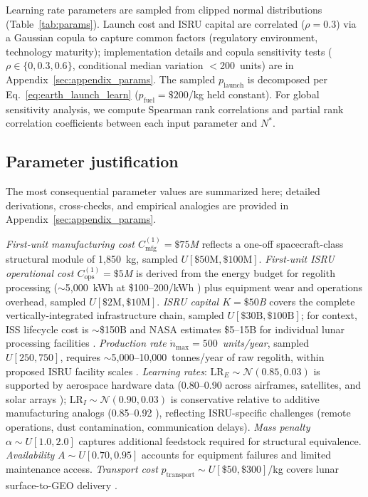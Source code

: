 \documentclass[preprint,12pt]{elsarticle}
\begin{document}
Learning rate parameters are sampled from clipped normal distributions (Table~\ref{tab:params}). Launch cost and ISRU capital are correlated ($\rho = 0.3$) via a Gaussian copula to capture common factors (regulatory environment, technology maturity); implementation details and copula sensitivity tests ($\rho \in \{0, 0.3, 0.6\}$, conditional median variation $<$200~units) are in Appendix~\ref{sec:appendix_params}. The sampled $p_{\mathrm{launch}}$ is decomposed per Eq.~\ref{eq:earth_launch_learn} ($p_{\mathrm{fuel}} = \$200$/kg held constant). For global sensitivity analysis, we compute Spearman rank correlations and partial rank correlation coefficients between each input parameter and $N^*$.

\subsection{Parameter justification}
\label{sec:param_justification}

The most consequential parameter values are summarized here; detailed derivations, cross-checks, and empirical analogies are provided in Appendix~\ref{sec:appendix_params}.

\emph{First-unit manufacturing cost $C_{\mathrm{mfg}}^{(1)} = \$75$M} reflects a one-off spacecraft-class structural module of 1{,}850~kg, sampled $U[\$50\text{M}, \$100\text{M}]$. \emph{First-unit ISRU operational cost $C_{\mathrm{ops}}^{(1)} = \$5$M} is derived from the energy budget for regolith processing ($\sim$5{,}000~kWh at \$100--200/kWh \cite{cilliers2023}) plus equipment wear and operations overhead, sampled $U[\$2\text{M}, \$10\text{M}]$. \emph{ISRU capital $K = \$50$B} covers the complete vertically-integrated infrastructure chain, sampled $U[\$30\text{B}, \$100\text{B}]$; for context, ISS lifecycle cost is $\sim$\$150B and NASA estimates \$5--15B for individual lunar processing facilities \cite{sanders2015,nasa2015handbook}. \emph{Production rate $\dot{n}_{\max} = 500$~units/year}, sampled $U[250, 750]$, requires $\sim$5{,}000--10{,}000~tonnes/year of raw regolith, within proposed ISRU facility scales \cite{sanders2015}. \emph{Learning rates}: $\mathrm{LR}_E \sim \mathcal{N}(0.85, 0.03)$ is supported by aerospace hardware data (0.80--0.90 across airframes, satellites, and solar arrays \cite{wright1936,wertz2011,nagy2013,argote1990}); $\mathrm{LR}_I \sim \mathcal{N}(0.90, 0.03)$ is conservative relative to additive manufacturing analogs (0.85--0.92 \cite{baumers2016}), reflecting ISRU-specific challenges (remote operations, dust contamination, communication delays). \emph{Mass penalty} $\alpha \sim U[1.0, 2.0]$ captures additional feedstock required for structural equivalence. \emph{Availability} $A \sim U[0.70, 0.95]$ accounts for equipment failures and limited maintenance access. \emph{Transport cost} $p_{\mathrm{transport}} \sim U[\$50, \$300]$/kg covers lunar surface-to-GEO delivery \cite{ishimatsu2016}.
\end{document}
